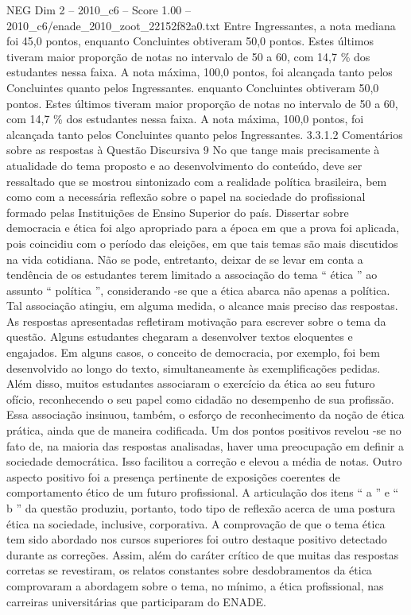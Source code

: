 \begin{textsample}{NEG Dim 2 – 2010\_c6 – Score 1.00 – 2010\_c6/enade\_2010\_zoot\_22152f82a0.txt}
Entre Ingressantes, a nota mediana foi 45,0 pontos, enquanto Concluintes obtiveram 50,0 pontos.
Estes últimos tiveram maior proporção de notas no intervalo de 50 a 60, com 14,7 \% dos estudantes nessa faixa.
A nota máxima, 100,0 pontos, foi alcançada tanto pelos Concluintes quanto pelos Ingressantes. enquanto Concluintes obtiveram 50,0 pontos.
Estes últimos tiveram maior proporção de notas no intervalo de 50 a 60, com 14,7 \% dos estudantes nessa faixa.
A nota máxima, 100,0 pontos, foi alcançada tanto pelos Concluintes quanto pelos Ingressantes. 3.3.1.2 Comentários sobre as respostas à Questão Discursiva 9 No que tange mais precisamente à atualidade do tema proposto e ao desenvolvimento do conteúdo, deve ser ressaltado que se mostrou sintonizado com a realidade política brasileira, bem como com a necessária reflexão sobre o papel na sociedade do profissional formado pelas Instituições de Ensino Superior do país.
Dissertar sobre democracia e ética foi algo apropriado para a época em que a prova foi aplicada, pois coincidiu com o período das eleições, em que tais temas são mais discutidos na vida cotidiana.
Não se pode, entretanto, deixar de se levar em conta a tendência de os estudantes terem limitado a associação do tema “ ética ” ao assunto “ política ”, considerando -se que a ética abarca não apenas a política.
Tal associação atingiu, em alguma medida, o alcance mais preciso das respostas.
As respostas apresentadas refletiram motivação para escrever sobre o tema da questão.
Alguns estudantes chegaram a desenvolver textos eloquentes e engajados.
Em alguns casos, o conceito de democracia, por exemplo, foi bem desenvolvido ao longo do texto, simultaneamente às exemplificações pedidas.
Além disso, muitos estudantes associaram o exercício da ética ao seu futuro ofício, reconhecendo o seu papel como cidadão no desempenho de sua profissão.
Essa associação insinuou, também, o esforço de reconhecimento da noção de ética prática, ainda que de maneira codificada.
Um dos pontos positivos revelou -se no fato de, na maioria das respostas analisadas, haver uma preocupação em definir a sociedade democrática.
Isso facilitou a correção e elevou a média de notas.
Outro aspecto positivo foi a presença pertinente de exposições coerentes de comportamento ético de um futuro profissional.
A articulação dos itens “ a ” e “ b ” da questão produziu, portanto, todo tipo de reflexão acerca de uma postura ética na sociedade, inclusive, corporativa.
A comprovação de que o tema ética tem sido abordado nos cursos superiores foi outro destaque positivo detectado durante as correções.
Assim, além do caráter crítico de que muitas das respostas corretas se revestiram, os relatos constantes sobre desdobramentos da ética comprovaram a abordagem sobre o tema, no mínimo, a ética profissional, nas carreiras universitárias que participaram do ENADE.

\end{textsample}

